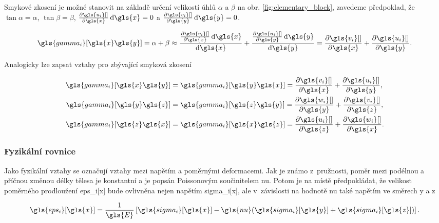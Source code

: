 Smykové zkosení je možné stanovit na základě určení velikostí úhlů $\alpha$ a $\beta$ na obr. \ref{fig:elementary_block}, zavedeme předpoklad, že $\tan{\alpha} = \alpha$, $\tan{\beta}=\beta$, $\pdv{\gls{u_i}[ ]}{\gls{x}} \dd{\gls{x}} = 0$ a $\pdv{\gls{v_i}[ ]}{\gls{y}}\dd{\gls{y}} = 0$.

\begin{equation}
    \gls{gamma_i}[\gls{x}\gls{y}]
    =
    \alpha + \beta
    \approx
    \frac{\pdv{\gls{v_i}[ ]}{\gls{x}}\dd{\gls{x}}}{\dd{\gls{x}}}
    +
    \frac{\pdv{\gls{u_i}[ ]}{\gls{y}}\dd{\gls{y}}}{\dd{\gls{y}}}
    =
    \pdv{\gls{v_i}[ ]}{\gls{x}} + \pdv{\gls{u_i}[ ]}{\gls{y}}
    .
\end{equation}

Analogicky lze zapsat vztahy pro zbývající smyková zkosení

\begin{equation}
    \begin{aligned}
        \gls{gamma_i}[\gls{x}\gls{y}] & = \gls{gamma_i}[\gls{y}\gls{x}] = \pdv{\gls{v_i}[ ]}{\gls{x}} + \pdv{\gls{u_i}[ ]}{\gls{y}}, \\
        \gls{gamma_i}[\gls{y}\gls{z}] & = \gls{gamma_i}[\gls{z}\gls{y}] = \pdv{\gls{w_i}[ ]}{\gls{y}} + \pdv{\gls{v_i}[ ]}{\gls{z}}, \\
        \gls{gamma_i}[\gls{z}\gls{x}] & = \gls{gamma_i}[\gls{x}\gls{z}] = \pdv{\gls{u_i}[ ]}{\gls{z}} + \pdv{\gls{w_i}[ ]}{\gls{x}}.
    \end{aligned}
\end{equation}

\subsubsection*{Fyzikální rovnice}

Jako fyzikální vztahy se označují vztahy mezi napětím a poměrnými deformacemi. Jak je známo z~pružnosti, poměr mezi podélnou a příčnou změnou délky tělesa je konstantní a je popsán Poissonovým součinitelem \gls{nu}. Potom je na místě předpokládat, že velikost poměrného prodloužení \gls{eps_i}[\gls{x}] bude ovlivněna nejen napětím \gls{sigma_i}[\gls{x}], ale v~závislosti na hodnotě \gls{nu} také napětím ve směrech \gls{y} a \gls{z} \cite[7]{teorie_pruznosti}

\begin{equation}
    \gls{eps_i}[\gls{x}] = \frac{1}{\gls{E}} \left[ \gls{sigma_i}[\gls{x}] - \gls{nu} (\gls{sigma_i}[\gls{y}] + \gls{sigma_i}[\gls{z}])  \right].
\end{equation}

